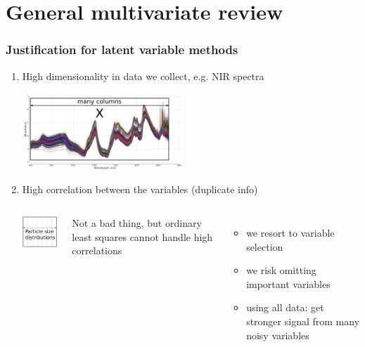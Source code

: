 \section{General multivariate review}

\begin{frame}\frametitle{Justification for latent variable methods}

\begin{enumerate}
	\item	High dimensionality in data we collect, e.g. NIR spectra
			\begin{center}
				\includegraphics[width=6cm]{images/high-dimensionality-data.jpg}
			\end{center}
			
			
	\item	High correlation between the variables (duplicate info)
			\vspace{6pt}
			\begin{columns}
				\begin{center}
					\includegraphics[width=3cm]{images/high-correlation-between-variables.png}
				\end{center}
				
				Not a bad thing, but ordinary least squares cannot handle high correlations
				\begin{itemize}
					\item	we resort to variable selection					
					\item	we risk omitting important variables
					\item	using all data: get stronger signal from many noisy variables
				\end{itemize}
				
			\end{columns}
			
\end{enumerate}
\end{frame}

